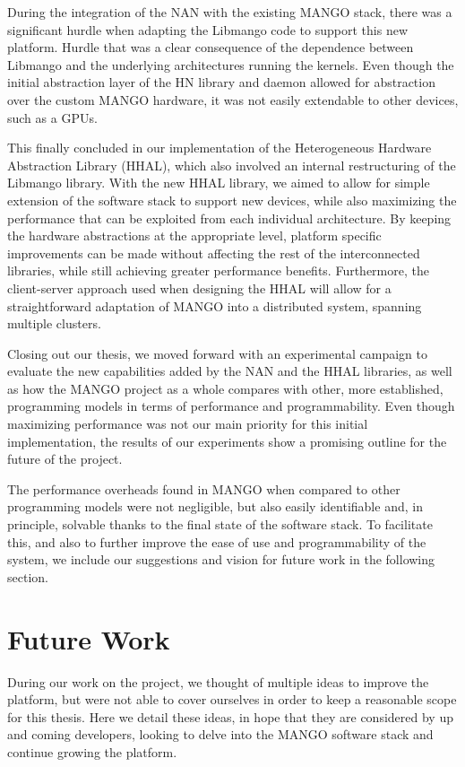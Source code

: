 During the integration of the NAN with the existing MANGO stack, there was a significant hurdle when adapting the Libmango code to support this new platform. Hurdle that was a clear consequence of the dependence between Libmango and the underlying architectures running the kernels. Even though the initial abstraction layer of the HN library and daemon allowed for abstraction over the custom MANGO hardware, it was not easily extendable to other devices, such as a GPUs.

This finally concluded in our implementation of the Heterogeneous Hardware Abstraction Library (HHAL), which also involved an internal restructuring of the Libmango library. With the new HHAL library, we aimed to allow for simple extension of the software stack to support new devices, while also maximizing the performance that can be exploited from each individual architecture. By keeping the hardware abstractions at the appropriate level, platform specific improvements can be made without affecting the rest of the interconnected libraries, while still achieving greater performance benefits. Furthermore, the client-server approach used when designing the HHAL will allow for a straightforward adaptation of MANGO into a distributed system, spanning multiple clusters.

Closing out our thesis, we moved forward with an experimental campaign to evaluate the new capabilities added by the NAN and the HHAL libraries, as well as how the MANGO project as a whole compares with other, more established, programming models in terms of performance and programmability. Even though maximizing performance was not our main priority for this initial implementation, the results of our experiments show a promising outline for the future of the project. 

The performance overheads found in MANGO when compared to other programming models were not negligible, but also easily identifiable and, in principle, solvable thanks to the final state of the software stack. To facilitate this, and also to further improve the ease of use and programmability of the system, we include our suggestions and vision for future work in the following section.

\section{Future Work} \label{sect:future-work}

During our work on the project, we thought of multiple ideas to improve the platform, but were not able to cover ourselves in order to keep a reasonable scope for this thesis. Here we detail these ideas, in hope that they are considered by up and coming developers, looking to delve into the MANGO software stack and continue growing the platform.

